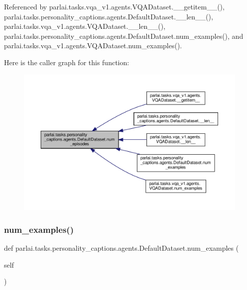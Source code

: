 Referenced by parlai.\+tasks.\+vqa\+\_\+v1.\+agents.\+V\+Q\+A\+Dataset.\+\_\+\+\_\+getitem\+\_\+\+\_\+(), parlai.\+tasks.\+personality\+\_\+captions.\+agents.\+Default\+Dataset.\+\_\+\+\_\+len\+\_\+\+\_\+(), parlai.\+tasks.\+vqa\+\_\+v1.\+agents.\+V\+Q\+A\+Dataset.\+\_\+\+\_\+len\+\_\+\+\_\+(), parlai.\+tasks.\+personality\+\_\+captions.\+agents.\+Default\+Dataset.\+num\+\_\+examples(), and parlai.\+tasks.\+vqa\+\_\+v1.\+agents.\+V\+Q\+A\+Dataset.\+num\+\_\+examples().

Here is the caller graph for this function\+:
\nopagebreak
\begin{figure}[H]
\begin{center}
\leavevmode
\includegraphics[width=350pt]{classparlai_1_1tasks_1_1personality__captions_1_1agents_1_1DefaultDataset_a09fb1bf7bf9dc5ab00ef9f32388336ea_icgraph}
\end{center}
\end{figure}
\mbox{\label{classparlai_1_1tasks_1_1personality__captions_1_1agents_1_1DefaultDataset_a043423c38c701ceadd6fec7cf5168816}} 
\subsubsection{\texorpdfstring{num\+\_\+examples()}{num\_examples()}}
{\footnotesize\ttfamily def parlai.\+tasks.\+personality\+\_\+captions.\+agents.\+Default\+Dataset.\+num\+\_\+examples (\begin{DoxyParamCaption}\item[{}]{self }\end{DoxyParamCaption})}

